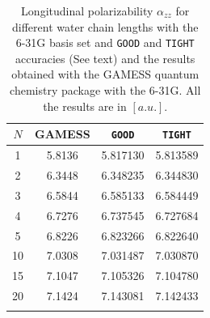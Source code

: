 \documentclass[prl,aps,twocolumn,showpacs,twocolumngrid,superbib]{revtex4}
\begin{document}
\begin{table}[t]
  \centering
  \caption{\protect
    Longitudinal polarizability $\alpha_{zz}$
    for different water chain lengths with the 6-31G basis set
    and {\tt GOOD} and {\tt TIGHT} accuracies (See text) and the results obtained with
    the GAMESS quantum chemistry package \cite{gamess} with the 6-31G. 
    All the results are in $[a.u.]$.
  }\label{tab:Alpha_1D_Values}
  \begin{tabular}{cccc}
    \toprule
    $N$ &\multicolumn{1}{c}{{\sc GAMESS}}
        &\multicolumn{1}{c}{{\tt GOOD}}
        &\multicolumn{1}{c}{{\tt TIGHT}}\\
    \hline
     1 & 5.8136 & 5.817130 & 5.813589  \\
     2 & 6.3448 & 6.348235 & 6.344830  \\
     3 & 6.5844 & 6.585133 & 6.584449  \\
     4 & 6.7276 & 6.737545 & 6.727684  \\
     5 & 6.8226 & 6.823266 & 6.822640  \\
    10 & 7.0308 & 7.031487 & 7.030870  \\
    15 & 7.1047 & 7.105326 & 7.104780  \\
    20 & 7.1424 & 7.143081 & 7.142433  \\
    \botrule
  \end{tabular}
\end{table}
\end{document}
